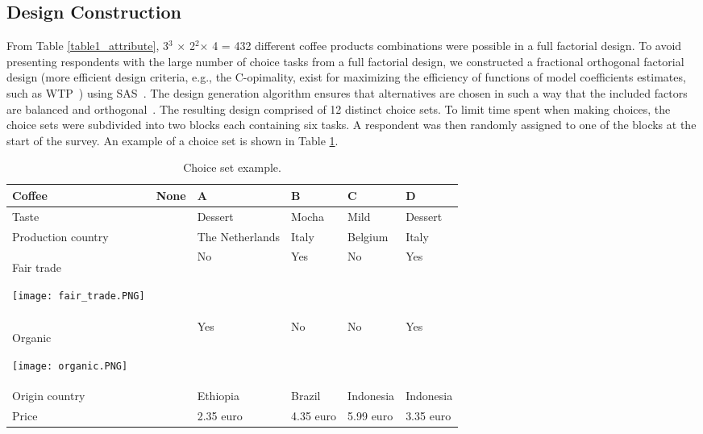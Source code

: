 \documentclass[sustainability,article,accept,moreauthors,pdftex,10pt,a4paper]{Definitions/mdpi}
\theoremstyle{mdpi}
\newcounter{thm}
\newcounter{ex}
\newcounter{re}
\theoremstyle{mdpidefinition}
\begin{document}
\subsection{Design Construction}\label{design}
\par{From Table \ref{table1_attribute}, 3$^3$ $\times$ 2$^2$$\times$ 4 = 432 different coffee products combinations were possible in a full factorial design. To avoid presenting respondents with the large number of choice tasks from a full factorial design, we constructed a fractional orthogonal factorial design (more efficient design criteria, e.g., the C-opimality, exist for maximizing the efficiency of functions of model coefficients estimates, such as WTP~\cite{Scarpa2008}) using SAS~\cite{SASInstituteInc2014}. The design generation algorithm ensures that alternatives are chosen in such a way that the included factors are balanced and orthogonal~\cite{Street2005,Kuhfeld2010}. The resulting design comprised of 12 distinct choice sets. To limit time spent when making choices, the choice sets were subdivided into two blocks each containing six tasks. A respondent was then randomly assigned to one of the blocks at the start of the survey. An example of a choice set is shown in Table \ref{figureorthogonal}.
\begin{table}[H]
\centering
\caption{Choice set example.}
\vspace{-6pt}
\begin{tabular}{p{4.5cm}p{1.1cm} p{2.3cm} p{1.65cm} p{1.65cm} p{1.65cm}}\\ \toprule
\textbf{Coffee} & \textbf{None} & \textbf{A} & \textbf{B} & \textbf{C} & \textbf{D}  \\ \midrule
Taste & &  Dessert & Mocha & Mild & Dessert\\
Production country & & The Netherlands & Italy & Belgium & Italy \\
Fair trade \begin{minipage}{.2\textwidth}
\texttt{[image: fair\_trade.PNG]} \vspace{2pt}
\end{minipage} & & No & Yes & No & Yes \\
Organic \begin{minipage}{.2\textwidth}
\texttt{[image: organic.PNG]}
\end{minipage} & & Yes & No & No & Yes\\
Origin country & & Ethiopia & Brazil & Indonesia & Indonesia  \\
Price & & 2.35 euro & 4.35 euro & 5.99  euro & 3.35 euro \\ \bottomrule
\end{tabular}
\label{figureorthogonal}
\end{table}
}
\end{document}
